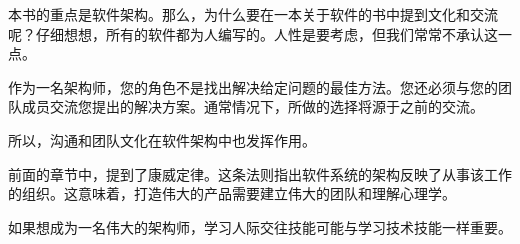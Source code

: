 本书的重点是软件架构。那么，为什么要在一本关于软件的书中提到文化和交流呢？仔细想想，所有的软件都为人编写的。人性是要考虑，但我们常常不承认这一点。

作为一名架构师，您的角色不是找出解决给定问题的最佳方法。您还必须与您的团队成员交流您提出的解决方案。通常情况下，所做的选择将源于之前的交流。

所以，沟通和团队文化在软件架构中也发挥作用。

前面的章节中，提到了康威定律。这条法则指出软件系统的架构反映了从事该工作的组织。这意味着，打造伟大的产品需要建立伟大的团队和理解心理学。

如果想成为一名伟大的架构师，学习人际交往技能可能与学习技术技能一样重要。